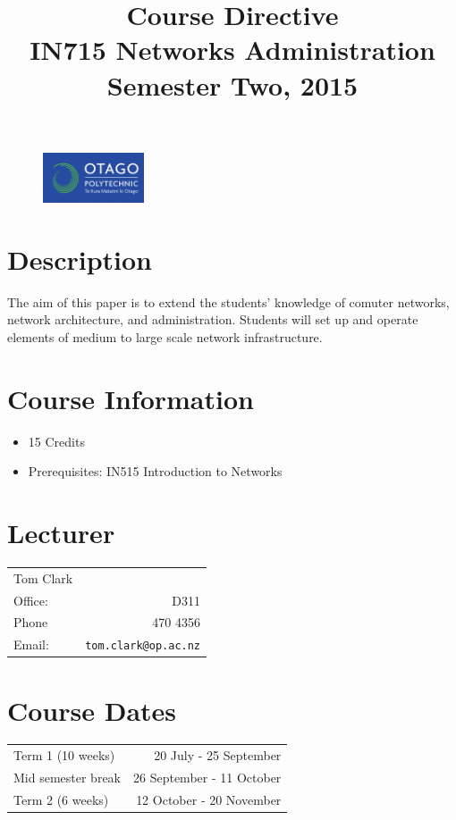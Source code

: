 \documentclass{article}
\begin{document}
\begin{figure}
\includegraphics[width=30mm]{../../../resources/images/oplogo.png}
\end{figure}

\title{Course Directive\\IN715 Networks Administration\\Semester Two, 2015}
\date{}
\maketitle

\section*{Description}
The aim of this paper is to extend the students' knowledge of comuter networks, network architecture, and administration. Students will set up and operate elements of medium to large scale network infrastructure.

\section*{Course Information}
\begin{itemize}
  \item 15 Credits
  \item Prerequisites: IN515 Introduction to Networks
\end{itemize}

\section*{Lecturer}
\begin{tabular}{lr}

  Tom Clark &    \\
     Office: & D311 \\
     Phone & 470 4356 \\
     Email: & \texttt{tom.clark@op.ac.nz} \\
\end{tabular}

\section*{Course Dates}
\begin{tabular}{lr}
Term 1 (10 weeks) & 20 July - 25 September \\
Mid semester break & 26 September - 11 October \\
Term 2 (6 weeks) & 12 October - 20 November \\
\end{tabular}
\end{document}
